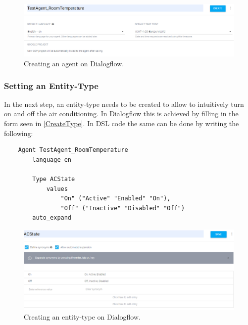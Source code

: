 \begin{figure}[ht]
    \centering
    \includegraphics[width=1\textwidth]{Thesis Images/CreateAgent.PNG}
    \caption{Creating an agent on Dialogflow.}
        \label{CreateAgent}
\end{figure}

\subsubsection{Setting an Entity-Type}
In the next step, an entity-type needs to be created to allow to intuitively turn on and off the air conditioning.
In Dialogflow this is achieved by filling in the form seen in \autoref{CreateType}.
In DSL code the same can be done by writing the following:

\begin{verbatim}
    Agent TestAgent_RoomTemperature
        language en 
    
        Type ACState
            values 
                "On" ("Active" "Enabled" "On"),
                "Off" ("Inactive" "Disabled" "Off")
        auto_expand
\end{verbatim}

\begin{figure}[ht]
    \centering
    \includegraphics[width=1\textwidth]{Thesis Images/CreateType.PNG}
    \caption{Creating an entity-type on Dialogflow.}
        \label{CreateType}
\end{figure}


